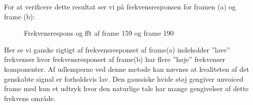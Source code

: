 For at verificere dette resultat ser vi på frekvensresponsen for framen (a) og frame (b):
 \begin{figure}[!h]
	\centering
	\caption{ Frekvensrespons og fft af frame 159 og frame 190 }
	\label{fig:part4_vocaltrack}
\end{figure}

Her se vi ganske rigtigt af frekvensresponset af frame(a) indeholder ''lave'' frekvenser hvor frekvensresponset af frame(b) har flere ''høje'' frekvenser komponenter.
Af udlemperne ved denne metode kan nævnes at kvaliteten af det genskabte signal er forholdsvis lav. Den gaussiske hvide støj gengiver  unvoiced frame med kun et udtryk hvor den naturlige tale har mange gengivelser af dette frekvens område.   